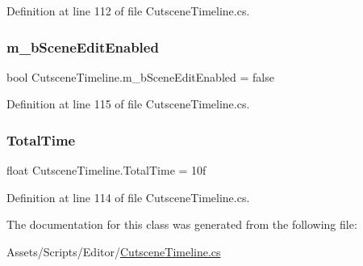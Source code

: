 Definition at line 112 of file Cutscene\+Timeline.\+cs.

\mbox{\label{class_cutscene_timeline_a0ddcb630d2d5dcfea4d5e3d44dd7cce6}} 
\subsubsection{\texorpdfstring{m\+\_\+b\+Scene\+Edit\+Enabled}{m\_bSceneEditEnabled}}
{\footnotesize\ttfamily bool Cutscene\+Timeline.\+m\+\_\+b\+Scene\+Edit\+Enabled = false}



Definition at line 115 of file Cutscene\+Timeline.\+cs.

\mbox{\label{class_cutscene_timeline_a1ba003967086092a98e24bdfb58dc645}} 
\subsubsection{\texorpdfstring{Total\+Time}{TotalTime}}
{\footnotesize\ttfamily float Cutscene\+Timeline.\+Total\+Time = 10f\hspace{0.3cm}{\ttfamily [static]}}



Definition at line 114 of file Cutscene\+Timeline.\+cs.



The documentation for this class was generated from the following file\+:\begin{DoxyCompactItemize}
\item 
Assets/\+Scripts/\+Editor/\mbox{\hyperlink{_cutscene_timeline_8cs}{Cutscene\+Timeline.\+cs}}\end{DoxyCompactItemize}
